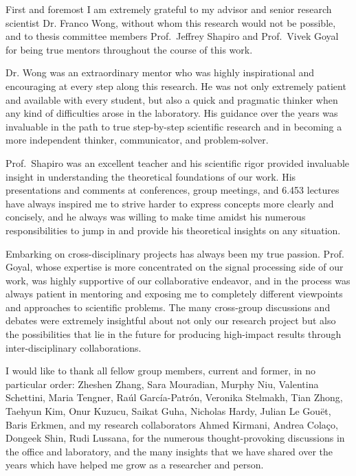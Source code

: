 First and foremost I am extremely grateful to my advisor and senior research scientist Dr. Franco Wong, without whom this research would not be possible, and to thesis committee members Prof.\ Jeffrey Shapiro and Prof.\ Vivek Goyal for being true mentors throughout the course of this work.

Dr. Wong was an extraordinary mentor who was highly inspirational and encouraging at every step along this research. He was not only extremely patient and available with every student, but also a quick and pragmatic thinker when any kind of difficulties arose in the laboratory. His guidance over the years was invaluable in the path to true step-by-step scientific research and in becoming a more independent thinker, communicator, and problem-solver.

Prof.\ Shapiro was an excellent teacher and his scientific rigor provided invaluable insight in understanding the theoretical foundations of our work. His presentations and comments at conferences, group meetings, and 6.453 lectures have always inspired me to strive harder to express concepts more clearly and concisely, and he always was willing to make time amidst his numerous responsibilities to jump in and provide his theoretical insights on any situation.

Embarking on cross-disciplinary projects has always been my true passion. Prof. Goyal, whose expertise is more concentrated on the signal processing side of our work, was highly supportive of our collaborative endeavor, and in the process was always patient in mentoring and exposing me to completely different viewpoints and approaches to scientific problems. The many cross-group discussions and debates were extremely insightful about not only our research project but also the possibilities that lie in the future for producing high-impact results through inter-disciplinary collaborations.

I would like to thank all fellow group members, current and former, in no particular order: Zheshen Zhang, Sara Mouradian, Murphy Niu, Valentina Schettini, Maria Tengner, Ra\'{u}l Garc\'{i}a-Patr\'{o}n, Veronika Stelmakh, Tian Zhong, Taehyun Kim, Onur Kuzucu, Saikat Guha, Nicholas Hardy, Julian Le Gou\"{e}t, Baris Erkmen, and my research collaborators Ahmed Kirmani, Andrea Cola\c{c}o, Dongeek Shin, Rudi Lussana, for the numerous thought-provoking discussions in the office and laboratory, and the many insights that we have shared over the years which have helped me grow as a researcher and person.


